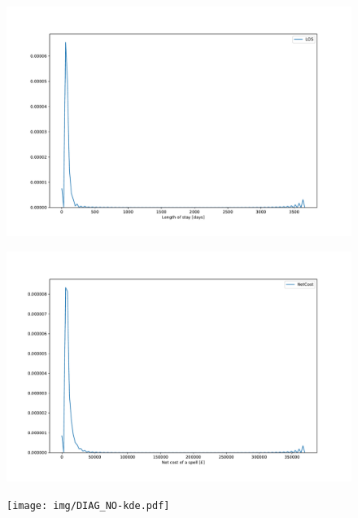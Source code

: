 \documentclass{article}
\begin{document}
\begin{figure}[h]
	\centering
	\begin{minipage}{.5\textwidth}
		\centering
		\includegraphics[width=\linewidth]{./img/LOS-kde.pdf}
		\label{fig:LOS-kde}
	\end{minipage}%
	\begin{minipage}{.5\textwidth}
		\centering
		\includegraphics[width=\linewidth]{img/NetCost-kde.pdf}
		\label{fig:NetCost-kde}
	\end{minipage}
    \begin{minipage}{.5\textwidth}
        \centering
        \texttt{[image: img/DIAG\_NO-kde.pdf]}
        \label{fig:DIAG_NO-kde}
    \end{minipage}%

\end{figure}
\end{document}
